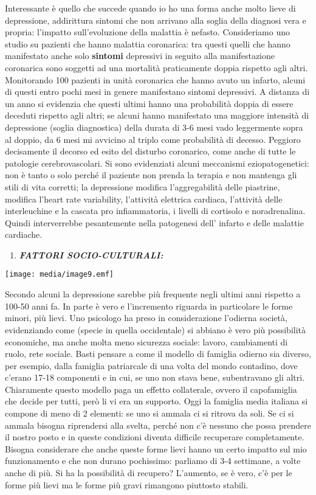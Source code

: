 \documentclass[]{article}
\begin{document}
Interessante è quello che succede quando io ho una forma anche molto
lieve di depressione, addirittura sintomi che non arrivano alla soglia
della diagnosi vera e propria: l'impatto sull'evoluzione della malattia
è nefasto. Consideriamo uno studio su pazienti che hanno malattia
coronarica: tra questi quelli che hanno manifestato anche solo
\textbf{sintomi} depressivi in seguito alla manifestazione coronarica
sono soggetti ad una mortalità praticamente doppia rispetto agli altri.
Monitorando 100 pazienti in unità coronarica che hanno avuto un infarto,
alcuni di questi entro pochi mesi in genere manifestano sintomi
depressivi. A distanza di un anno si evidenzia che questi ultimi hanno
una probabilità doppia di essere deceduti rispetto agli altri; se alcuni
hanno manifestato una maggiore intensità di depressione (soglia
diagnostica) della durata di 3-6 mesi vado leggermente sopra al doppio,
da 6 mesi mi avvicino al triplo come probabilità di decesso. Peggioro
decisamente il decorso ed esito del disturbo coronarico, come anche di
tutte le patologie cerebrovascolari. Si sono evidenziati alcuni
meccanismi eziopatogenetici: non è tanto o solo perché il paziente non
prenda la terapia e non mantenga gli stili di vita corretti; la
depressione modifica l'aggregabilità delle piastrine, modifica l'heart
rate variability, l'attività elettrica cardiaca, l'attività delle
interleuchine e la cascata pro infiammatoria, i livelli di cortisolo e
noradrenalina. Quindi interverrebbe pesantemente nella patogenesi dell'
infarto e delle malattie cardiache.

\begin{enumerate}
\def\labelenumi{\arabic{enumi}.}
\item
  \textbf{\emph{FATTORI SOCIO-CULTURALI:}}
\end{enumerate}

\texttt{[image: media/image9.emf]}

Secondo alcuni la depressione sarebbe più frequente negli ultimi anni
rispetto a 100-50 anni fa. In parte è vero e l'incremento riguarda in
particolare le forme minori, più lievi. Uno psicologo ha preso in
considerazione l'odierna società, evidenziando come (specie in quella
occidentale) si abbiano è vero più possibilità economiche, ma anche
molta meno sicurezza sociale: lavoro, cambiamenti di ruolo, rete
sociale. Basti pensare a come il modello di famiglia odierno sia
diverso, per esempio, dalla famiglia patriarcale di una volta del mondo
contadino, dove c'erano 17-18 componenti e in cui, se uno non stava
bene, subentravano gli altri. Chiaramente questo modello paga un effetto
collaterale, ovvero il capofamiglia che decide per tutti, però li vi era
un supporto. Oggi la famiglia media italiana si compone di meno di 2
elementi: se uno si ammala ci si ritrova da soli. Se ci si ammala
bisogna riprendersi alla svelta, perché non c'è nessuno che possa
prendere il nostro posto e in queste condizioni diventa difficile
recuperare completamente. Bisogna considerare che anche queste forme
lievi hanno un certo impatto sul mio funzionamento e che non durano
pochissimo: parliamo di 3-4 settimane, a volte anche di più. Si ha la
possibilità di recupero? L'aumento, se è vero, c'è per le forme più
lievi ma le forme più gravi rimangono piuttosto stabili.
\end{document}
